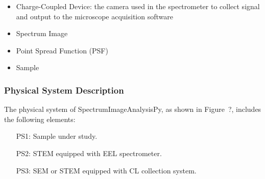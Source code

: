 \documentclass[12pt]{article}
\newcommand{\progname}{SpectrumImageAnalysisPy} %
\begin{document}
\begin{itemize}
	\item Charge-Coupled Device: the camera used in the spectrometer to collect signal and output to the microscope acquisition software
	\item Spectrum Image
	\item Point Spread Function (PSF)
	\item Sample
\end{itemize}

\subsubsection{Physical System Description}

The physical system of \progname{}, as shown in Figure~?,
includes the following elements:

\begin{itemize}

	\item[PS1:] Sample under study.
	\item[PS2:] STEM equipped with EEL spectrometer.
	\item[PS3:] SEM or STEM equipped with CL collection system.

%

\end{itemize}




\end{document}
